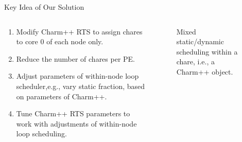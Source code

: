 \begin{frame}{Key Idea of Our Solution}
\begin{columns}
\begin{column}{0.5\columnwidth}
\begin{enumerate}
 \item Modify Charm++ RTS to assign chares to core 0 of each node only.
 \item Reduce the number of chares per PE.
 \item Adjust parameters of within-node loop scheduler,e.g., vary
  static fraction, based on parameters of Charm++. 
\item Tune Charm++ RTS parameters to work with adjustments of within-node loop scheduling.
\end{enumerate}
\end{column}
\begin{column}{0.5\columnwidth}
  \begin{figure}
    \label{fig:statDynSched}
    \begin{center}
      \hspace*{0.1in}
               \hspace*{0.1in}
    \end{center}
    \caption{\label{fig:statDynSched} \tiny Mixed static/dynamic scheduling within a chare, i.e., a
      Charm++ object.}
  \end{figure}
\end{column}
\end{columns}
\end{frame}

